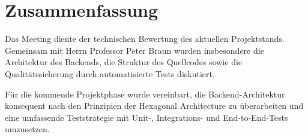 \documentclass[a4paper,11pt]{article}
\begin{document}
\vspace{1cm}

\section{Zusammenfassung}

Das Meeting diente der technischen Bewertung des aktuellen Projektstands. Gemeinsam mit Herrn Professor Peter Braun wurden insbesondere die Architektur des Backends, die Struktur des Quellcodes sowie die Qualitätssicherung durch automatisierte Tests diskutiert.

Für die kommende Projektphase wurde vereinbart, die Backend-Architektur konsequent nach den Prinzipien der Hexagonal Architecture zu überarbeiten und eine umfassende Teststrategie mit Unit-, Integrations- und End-to-End-Tests umzusetzen.
\end{document}
